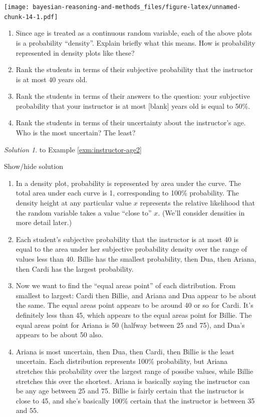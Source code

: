 \documentclass[
]{book}
\providecommand{\tightlist}{%
  \setlength{\itemsep}{0pt}\setlength{\parskip}{0pt}}
\theoremstyle{definition}
\theoremstyle{definition}
\theoremstyle{definition}
\theoremstyle{remark}
\newtheorem*{solution}{Solution}
\begin{document}
\texttt{[image: bayesian-reasoning-and-methods\_files/figure-latex/unnamed-chunk-14-1.pdf]}

\begin{enumerate}
\def\labelenumi{\arabic{enumi}.}
\tightlist
\item
  Since age is treated as a continuous random variable, each of the above plots is a probability ``density''. Explain briefly what this means. How is probability represented in density plots like these?
\item
  Rank the students in terms of their subjective probability that the instructor is at most 40 years old.
\item
  Rank the students in terms of their answers to the question: your subjective probability that your instructor is at most {[}blank{]} years old is equal to 50\%.
\item
  Rank the students in terms of their uncertainty about the instructor's age. Who is the most uncertain? The least?
\end{enumerate}

\begin{solution}
{}
to Example \ref{exm:instructor-age2}
\end{solution}

Show/hide solution

\begin{enumerate}
\def\labelenumi{\arabic{enumi}.}
\tightlist
\item
  In a density plot, probability is represented by area under the curve. The total area under each curve is 1, corresponding to 100\% probability. The density height at any particular value \(x\) represents the relative likelihood that the random variable takes a value ``close to'' \(x\). (We'll consider densities in more detail later.)
\item
  Each student's subjective probability that the instructor is at most 40 is equal to the area under her subjective probability density over the range of values less than 40. Billie has the smallest probability, then Dua, then Ariana, then Cardi has the largest probability.
\item
  Now we want to find the ``equal areas point'' of each distribution. From smallest to largest: Cardi then Billie, and Ariana and Dua appear to be about the same. The equal areas point appears to be around 40 or so for Cardi. It's definitely less than 45, which appears to the equal areas point for Billie. The equal areas point for Ariana is 50 (halfway between 25 and 75), and Dua's appears to be about 50 also.
\item
  Ariana is most uncertain, then Dua, then Cardi, then Billie is the least uncertain. Each distribution represents 100\% probability, but Ariana stretches this probability over the largest range of possibe values, while Billie stretches this over the shortest. Ariana is basically saying the instructor can be any age between 25 and 75. Billie is fairly certain that the instructor is close to 45, and she's basically 100\% certain that the instructor is between 35 and 55.
\end{enumerate}
\end{document}
